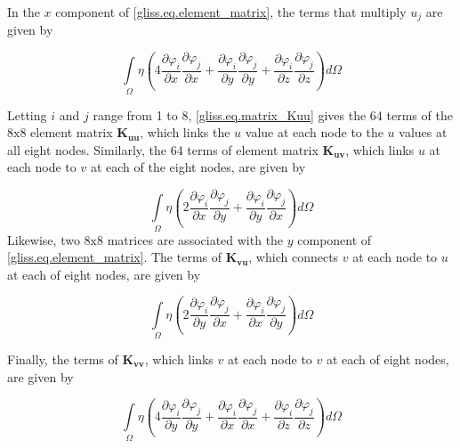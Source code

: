 In the $x$ component of \eqref{gliss.eq.element_matrix}, 
the terms that multiply $u_j$ are given by
 
\begin{equation}
  \label{gliss.eq.matrix_Kuu}
  \int\limits_{\Omega }{\eta \left( 4\frac{\partial {{\varphi }_{i}}}{\partial x}\frac{\partial {{\varphi }_{j}}}{\partial x} +
    \frac{\partial {{\varphi }_{i}}}{\partial y}\frac{\partial {{\varphi}_{j}}}{\partial y} + 
    \frac{\partial {{\varphi }_{i}}}{\partial z}\frac{\partial {{\varphi }_{j}}}{\partial z} \right)}d\Omega
\end{equation}

\noindent
Letting $i$ and $j$ range from 1 to 8, \eqref{gliss.eq.matrix_Kuu} gives the 64 terms of the $8\text{x}8$ element matrix $\mathbf{K_{uu}}$,
which links the $u$ value at each node to the $u$ values at all eight nodes.
Similarly, the 64 terms of element matrix $\mathbf{K_{uv}}$, which links $u$ at each node to $v$ at each of the eight nodes,
are given by

\begin{equation}
  \label{gliss.eq.matrix_Kuv}
  \int\limits_{\Omega }{\eta \left( 2\frac{\partial {{\varphi }_{i}}}{\partial x}\frac{\partial {{\varphi }_{j}}}{\partial y}+\frac{\partial {{\varphi }_{i}}}{\partial y}\frac{\partial {{\varphi }_{j}}}{\partial x} \right)}d\Omega
\end{equation}
%
Likewise, two $8\text{x}8$ matrices are associated with the $y$ component of \eqref{gliss.eq.element_matrix}.  
The terms of $\mathbf{K_{vu}}$, which connects $v$ at each node to $u$ at each of eight nodes, are given by

\begin{equation}
  \label{gliss.eq.matrix_Kvu}
  \int\limits_{\Omega }{\eta \left( 2\frac{\partial {{\varphi }_{i}}}{\partial y}\frac{\partial {{\varphi }_{j}}}{\partial x}+\frac{\partial {{\varphi }_{i}}}{\partial x}\frac{\partial {{\varphi }_{j}}}{\partial y} \right)}d\Omega
\end{equation}

\noindent
Finally, the terms of $\mathbf{K_{vv}}$, which links $v$ at each node to $v$ at each of eight nodes, are given by

\begin{equation}
  \label{gliss.eq.matrix_Kvv}
  \int\limits_{\Omega }{\eta \left( 4\frac{\partial {{\varphi }_{i}}}{\partial y}\frac{\partial {{\varphi }_{j}}}{\partial y}+\frac{\partial {{\varphi }_{i}}}{\partial x}\frac{\partial {{\varphi}_{j}}}{\partial x}+\frac{\partial {{\varphi }_{i}}}{\partial z}\frac{\partial {{\varphi }_{j}}}{\partial z} \right)}d\Omega
\end{equation}

